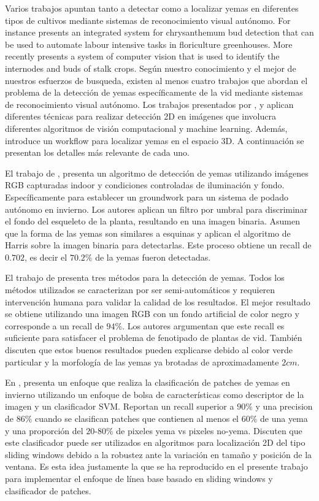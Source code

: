 \documentclass[a4paper,authoryear,review]{elsarticle}
\begin{document}
Varios trabajos apuntan tanto a detectar como a localizar yemas en diferentes tipos de cultivos mediante sistemas de reconocimiento visual autónomo. For instance \citet{tarry2014integrated} presents an integrated system for chrysanthemum bud detection that can be used to automate labour intensive tasks in floriculture greenhouses. More recently \citet{zhao2018research} presents a system  of  computer  vision  that is used  to  identify  the  internodes and  buds  of  stalk  crops. Según nuestro conocimiento y el mejor de nuestros esfuerzos de busqueda, existen al menos cuatro trabajos que abordan el problema de la detección de yemas específicamente de la vid mediante sistemas de reconocimiento visual autónomo. Los trabajos presentados por \citet{xu2014detection}, \citet{herzog2014objective} y \citet{perez2017image} aplican diferentes técnicas para realizar detección 2D en imágenes que involucra diferentes algoritmos de visión computacional y machine learning. Además, \citet{diaz2018grapevine} introduce un workflow para localizar yemas en el espacio 3D. A continuación se presentan los detalles más relevante de cada uno.

El trabajo de \citet{xu2014detection}, presenta un algoritmo de detección de yemas utilizando imágenes RGB capturadas indoor y condiciones controladas de iluminación y fondo. Específicamente para establecer un groundwork para un sistema de podado autónomo en invierno. Los autores aplican un filtro por umbral para discriminar el fondo del esqueleto de la planta, resultando en una imagen binaria. Asumen que la forma de las yemas son similares a esquinas y aplican el algoritmo de Harris sobre la imagen binaria para detectarlas. Este proceso obtiene un recall de $0.702$, es decir el $70.2\%$ de la yemas fueron detectadas. 

El trabajo de \citet{herzog2014objective} presenta tres métodos para la detección de yemas. Todos los métodos utilizados se caracterizan por ser semi-automáticos y requieren intervención humana para validar la calidad de los resultados. El mejor resultado se obtiene utilizando una imagen RGB con un fondo artificial de color negro y corresponde a un recall de $94\%$. Los autores argumentan que este recall es suficiente para satisfacer el problema de fenotipado de plantas de vid. También discuten que estos buenos resultados pueden explicarse debido al color verde particular y la morfología de las yemas ya brotadas de aproximadamente $2cm$. 

En \citet{perez2017image}, presenta un enfoque que realiza la clasificación de patches de yemas en invierno utilizando un enfoque de bolsa de características como descriptor de la imagen y un clasificador SVM. Reportan un recall superior a $90\%$ y una precision de $86\%$ cuando se clasifican patches que contienen al menos el $60\%$ de una yema y una proporción del $20$-$80\%$ de pixeles yema vs pixeles no-yema. Discuten que este clasificador puede ser utilizados en algoritmos para localización 2D del tipo sliding windows debido a la robustez ante la variación en tamaño y posición de la ventana. Es esta idea justamente la que se ha reproducido en el presente trabajo para implementar el enfoque de línea base basado en sliding windows y clasificador de patches.
\end{document}
